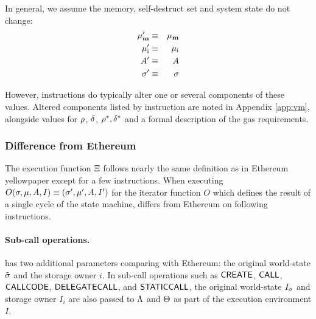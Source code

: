 In general, we assume the memory, self-destruct set and system state do not change:
\begin{eqnarray}
\mathbf{\mu}'_{\mathbf{m}} & \equiv & \mathbf{\mu}_{\mathbf{m}} \\
\mathbf{\mu}'_{\mathrm{i}} & \equiv & \mathbf{\mu}_{\mathrm{i}} \\
A' & \equiv & A \\
\mathbf{\sigma}' & \equiv & \mathbf{\sigma}
\end{eqnarray}

However, instructions do typically alter one or several components of these values. Altered components listed by instruction are noted in Appendix \ref{app:vm}, alongside values for $\mathbf{\rho}$, $\mathbf{\delta}$, $\mathbf{\rho}^*,\mathbf{\delta}^*$ and a formal description of the gas requirements.

\subsubsection{Difference from Ethereum}
The execution function $\mathrm{\Xi}$ follows nearly the same definition as in Ethereum yellowpaper \cite{ETH_yellow} except for a few instructions. 
When executing $O(\mathbf{\sigma}, \mu, A, I) \equiv (\mathbf{\sigma}' , \mu' , A , I')$ 
for the iterator function $O$ which defines the result of a single cycle of the state machine,
{\name} differs from Ethereum on following instructions. 




\paragraph{Sub-call operations.} 
{\name} has two additional parameters comparing with Ethereum: 
the original world-state $\tilde{\mathbf{\sigma}}$ and the storage owner $i$.
In sub-call operations such as $\mathsf{CREATE}$, $\mathsf{CALL}$, $\mathsf{CALLCODE}$, $\mathsf{DELEGATECALL}$, and $\mathsf{STATICCALL}$,  
the original world-state $I_{\mathbf{\sigma}}$ and storage owner $I_i$ are also passed to $\mathrm{\Lambda}$ and $\mathrm{\Theta}$ as part of the execution environment $I$. 



